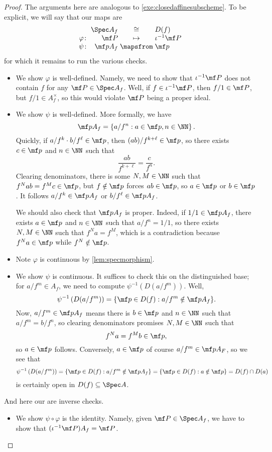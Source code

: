 \documentclass[../notes.tex]{subfiles}
\begin{document}
\begin{proof}
	The arguments here are analogous to \autoref{exe:closedaffinesubscheme}. To be explicit, we will say that our maps are
	\[\arraycolsep=1.4pt\begin{array}{crcl}
		& \Spec A_f &\cong& D(f) \\
		\varphi\colon& \mf P &\mapsto& \iota^{-1}\mf P \\
		\psi\colon& \mf pA_f &\mapsfrom& \mf p
	\end{array}\]
	for which it remains to run the various checks.
	\begin{itemize}
		\item We show $\varphi$ is well-defined. Namely, we need to show that $\iota^{-1}\mf P$ does not contain $f$ for any $\mf P\in\Spec A_f$. Well, if $f\in\iota^{-1}\mf P$, then $f/1\in\mf P$, but $f/1\in A_f^\times$, so this would violate $\mf P$ being a proper ideal.
		\item We show $\psi$ is well-defined. More formally, we have
		\[\mf pA_f=\left\{a/f^n:a\in\mf p,n\in\NN\right\}.\]
		Quickly, if $a/f^k\cdot b/f^\ell\in\mf p$, then $(ab)/f^{k+\ell}\in\mf p$, so there exists $c\in\mf p$ and $n\in\NN$ such that
		\[\frac{ab}{f^{k+\ell}}=\frac c{f^n}.\]
		Clearing denominators, there is some $N,M\in\NN$ such that $f^Nab=f^Mc\in\mf p$, but $f\notin\mf p$ forces $ab\in\mf p$, so $a\in\mf p$ or $b\in\mf p$. It follows $a/f^k\in\mf pA_f$ or $b/f^\ell\in\mf pA_f$.

		We should also check that $\mf pA_f$ is proper. Indeed, if $1/1\in\mf pA_f$, there exists $a\in\mf p$ and $n\in\NN$ such that $a/f^n=1/1$, so there exists $N,M\in\NN$ such that $f^Na=f^M$, which is a contradiction because $f^Na\in\mf p$ while $f^N\notin\mf p$.
		\item Note $\varphi$ is continuous by \autoref{lem:specmorphism}.
		\item We show $\psi$ is continuous. It suffices to check this on the distinguished base; for $a/f^m\in A_f$, we need to compute $\psi^{-1}\left(D(a/f^m)\right)$. Well,
		\[\psi^{-1}\left(D(a/f^m)\right)=\{\mf p\in D(f):a/f^m\notin\mf pA_f\}.\]
		Now, $a/f^m\in\mf pA_f$ means there is $b\in\mf p$ and $n\in\NN$ such that $a/f^m=b/f^n$, so clearing denominators promises $N,M\in\NN$ such that
		\[f^Na=f^Mb\in\mf p,\]
		so $a\in\mf p$ follows. Conversely, $a\in\mf p$ of course $a/f^m\in\mf pA_F$, so we see that
		\[\psi^{-1}\left(D(a/f^m)\right)=\{\mf p\in D(f):a/f^m\notin\mf pA_f\}=\{\mf p\in D(f):a\notin\mf p\}=D(f)\cap D(a)\]
		is certainly open in $D(f)\subseteq\Spec A$.
	\end{itemize}
	And here our are inverse checks.
	\begin{itemize}
		\item We show $\psi\circ\varphi$ is the identity. Namely, given $\mf P\in\Spec A_f$, we have to show that $(\iota^{-1}\mf P)A_f=\mf P$.
		

\end{itemize}
\end{proof}
\end{document}
